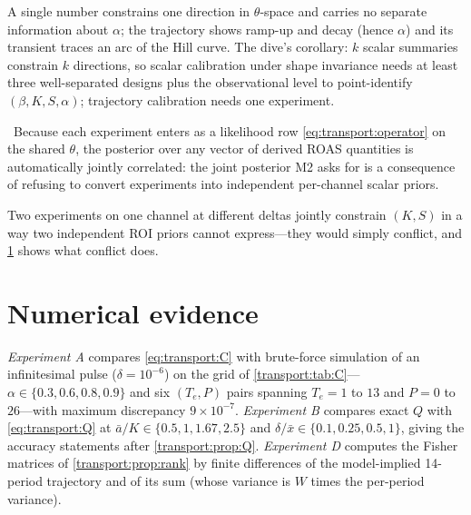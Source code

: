 A single number constrains one direction in $\theta$-space and carries no separate information about $\alpha$; the trajectory shows ramp-up and decay (hence $\alpha$) and its transient traces an arc of the Hill curve. The dive's corollary: $k$ scalar summaries constrain $k$ directions, so scalar calibration under shape invariance needs at least three well-separated designs plus the observational level to point-identify $(\beta, K, S, \alpha)$; trajectory calibration needs one experiment.

\begin{corollary}
\label{transport:cor:joint}
\tagEstablished\ Because each experiment enters as a likelihood row \cref{eq:transport:operator} on the shared $\theta$, the posterior over any vector of derived ROAS quantities is automatically jointly correlated: the joint posterior M2 asks for is a consequence of refusing to convert experiments into independent per-channel scalar priors.
\end{corollary}

Two experiments on one channel at different deltas jointly constrain $(K, S)$ in a way two independent ROI priors cannot express---they would simply conflict, and \cref{transport:sec:numerics} shows what conflict does.

\section{Numerical evidence}
\label{transport:sec:numerics}

\emph{Experiment A} compares \cref{eq:transport:C} with brute-force simulation of an infinitesimal pulse ($\delta = 10^{-6}$) on the grid of \cref{transport:tab:C}---$\alpha \in \{0.3, 0.6, 0.8, 0.9\}$ and six $(T_e, P)$ pairs spanning $T_e = 1$ to $13$ and $P = 0$ to $26$---with maximum discrepancy $9\times10^{-7}$. \emph{Experiment B} compares exact $Q$ with \cref{eq:transport:Q} at $\bar a/K \in \{0.5, 1, 1.67, 2.5\}$ and $\delta/\bar x \in \{0.1, 0.25, 0.5, 1\}$, giving the accuracy statements after \cref{transport:prop:Q}. \emph{Experiment D} computes the Fisher matrices of \cref{transport:prop:rank} by finite differences of the model-implied 14-period trajectory and of its sum (whose variance is $W$ times the per-period variance).

